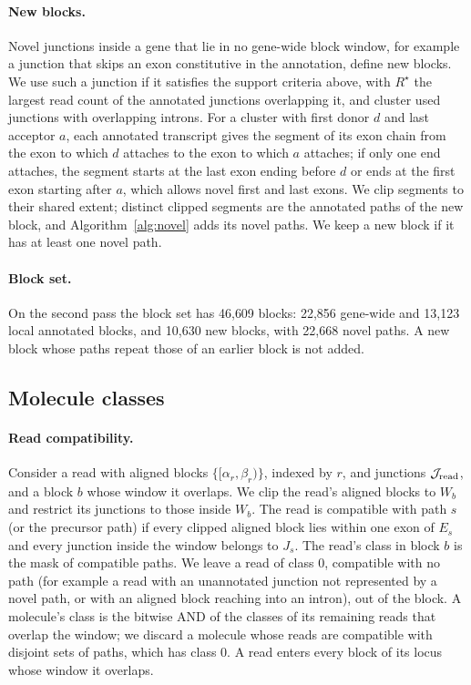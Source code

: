 \documentclass[11pt]{article}
\begin{document}
\paragraph{New blocks.} Novel junctions inside a gene that lie in no gene-wide block window, for example a junction that skips an exon constitutive in the annotation, define new blocks. We use such a junction if it satisfies the support criteria above, with $R^\star$ the largest read count of the annotated junctions overlapping it, and cluster used junctions with overlapping introns. For a cluster with first donor $d$ and last acceptor $a$, each annotated transcript gives the segment of its exon chain from the exon to which $d$ attaches to the exon to which $a$ attaches; if only one end attaches, the segment starts at the last exon ending before $d$ or ends at the first exon starting after $a$, which allows novel first and last exons. We clip segments to their shared extent; distinct clipped segments are the annotated paths of the new block, and Algorithm~\ref{alg:novel} adds its novel paths. We keep a new block if it has at least one novel path.

\paragraph{Block set.} On the second pass the block set has 46{,}609 blocks: 22{,}856 gene-wide and 13{,}123 local annotated blocks, and 10{,}630 new blocks, with 22{,}668 novel paths. A new block whose paths repeat those of an earlier block is not added.

\subsection{Molecule classes}
\label{sec:classes}

\paragraph{Read compatibility.} Consider a read with aligned blocks $\{[\alpha_r,\beta_r)\}$, indexed by $r$, and junctions $\mathcal J_{\rm read}$, and a block $b$ whose window it overlaps. We clip the read's aligned blocks to $W_b$ and restrict its junctions to those inside $W_b$. The read is compatible with path $s$ (or the precursor path) if every clipped aligned block lies within one exon of $E_s$ and every junction inside the window belongs to $J_s$. The read's class in block $b$ is the mask of compatible paths. We leave a read of class 0, compatible with no path (for example a read with an unannotated junction not represented by a novel path, or with an aligned block reaching into an intron), out of the block. A molecule's class is the bitwise AND of the classes of its remaining reads that overlap the window; we discard a molecule whose reads are compatible with disjoint sets of paths, which has class 0. A read enters every block of its locus whose window it overlaps.
\end{document}

